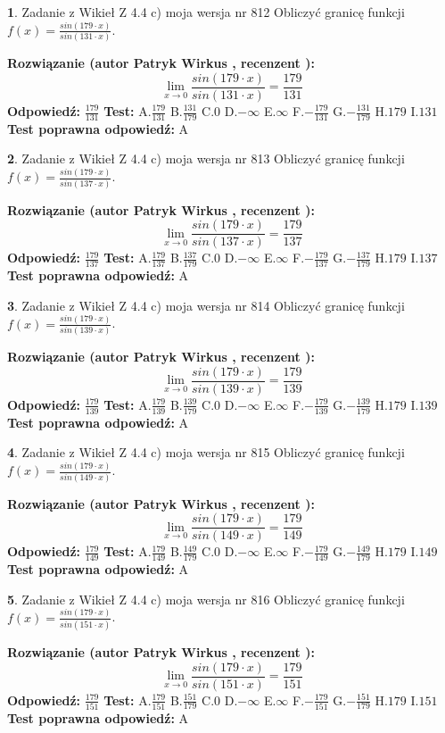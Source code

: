 \documentclass[12pt, a4paper]{article}
\theoremstyle{definition} %
\newtheorem{zad}{}
\newcommand{\zadStart}[1]{\begin{zad}#1\newline}
\newcommand{\zadStop}{\end{zad}}
\newcommand{\rozwStart}[2]{\noindent \textbf{Rozwiązanie (autor #1 , recenzent #2): }\newline}
\newcommand{\rozwStop}{\newline}
\newcommand{\odpStart}{\noindent \textbf{Odpowiedź:}\newline}
\newcommand{\odpStop}{\newline}
\newcommand{\testStart}{\noindent \textbf{Test:}\newline}
\newcommand{\testStop}{\newline}
\newcommand{\kluczStart}{\noindent \textbf{Test poprawna odpowiedź:}\newline}
\newcommand{\kluczStop}{\newline}
\begin{document}
\zadStart{Zadanie z Wikieł Z 4.4 c) moja wersja nr 812}
Obliczyć granicę funkcji $f(x)=\frac{sin(179\cdot x)}{sin(131\cdot x)}$.
\zadStop
\rozwStart{Patryk Wirkus}{}
$$\lim\limits_{x\to 0}\frac{sin(179\cdot x)}{sin(131\cdot x)}=
\frac{179}{131}$$
\rozwStop
\odpStart
$\frac{179}{131}$
\odpStop
\testStart
A.$\frac{179}{131}$
B.$\frac{131}{179}$
C.$0$
D.$-\infty$
E.$\infty$
F.$-\frac{179}{131}$
G.$-\frac{131}{179}$
H.$179$
I.$131$
\testStop
\kluczStart
A
\kluczStop



\zadStart{Zadanie z Wikieł Z 4.4 c) moja wersja nr 813}
Obliczyć granicę funkcji $f(x)=\frac{sin(179\cdot x)}{sin(137\cdot x)}$.
\zadStop
\rozwStart{Patryk Wirkus}{}
$$\lim\limits_{x\to 0}\frac{sin(179\cdot x)}{sin(137\cdot x)}=
\frac{179}{137}$$
\rozwStop
\odpStart
$\frac{179}{137}$
\odpStop
\testStart
A.$\frac{179}{137}$
B.$\frac{137}{179}$
C.$0$
D.$-\infty$
E.$\infty$
F.$-\frac{179}{137}$
G.$-\frac{137}{179}$
H.$179$
I.$137$
\testStop
\kluczStart
A
\kluczStop



\zadStart{Zadanie z Wikieł Z 4.4 c) moja wersja nr 814}
Obliczyć granicę funkcji $f(x)=\frac{sin(179\cdot x)}{sin(139\cdot x)}$.
\zadStop
\rozwStart{Patryk Wirkus}{}
$$\lim\limits_{x\to 0}\frac{sin(179\cdot x)}{sin(139\cdot x)}=
\frac{179}{139}$$
\rozwStop
\odpStart
$\frac{179}{139}$
\odpStop
\testStart
A.$\frac{179}{139}$
B.$\frac{139}{179}$
C.$0$
D.$-\infty$
E.$\infty$
F.$-\frac{179}{139}$
G.$-\frac{139}{179}$
H.$179$
I.$139$
\testStop
\kluczStart
A
\kluczStop



\zadStart{Zadanie z Wikieł Z 4.4 c) moja wersja nr 815}
Obliczyć granicę funkcji $f(x)=\frac{sin(179\cdot x)}{sin(149\cdot x)}$.
\zadStop
\rozwStart{Patryk Wirkus}{}
$$\lim\limits_{x\to 0}\frac{sin(179\cdot x)}{sin(149\cdot x)}=
\frac{179}{149}$$
\rozwStop
\odpStart
$\frac{179}{149}$
\odpStop
\testStart
A.$\frac{179}{149}$
B.$\frac{149}{179}$
C.$0$
D.$-\infty$
E.$\infty$
F.$-\frac{179}{149}$
G.$-\frac{149}{179}$
H.$179$
I.$149$
\testStop
\kluczStart
A
\kluczStop



\zadStart{Zadanie z Wikieł Z 4.4 c) moja wersja nr 816}
Obliczyć granicę funkcji $f(x)=\frac{sin(179\cdot x)}{sin(151\cdot x)}$.
\zadStop
\rozwStart{Patryk Wirkus}{}
$$\lim\limits_{x\to 0}\frac{sin(179\cdot x)}{sin(151\cdot x)}=
\frac{179}{151}$$
\rozwStop
\odpStart
$\frac{179}{151}$
\odpStop
\testStart
A.$\frac{179}{151}$
B.$\frac{151}{179}$
C.$0$
D.$-\infty$
E.$\infty$
F.$-\frac{179}{151}$
G.$-\frac{151}{179}$
H.$179$
I.$151$
\testStop
\kluczStart
A
\kluczStop
\end{document}
